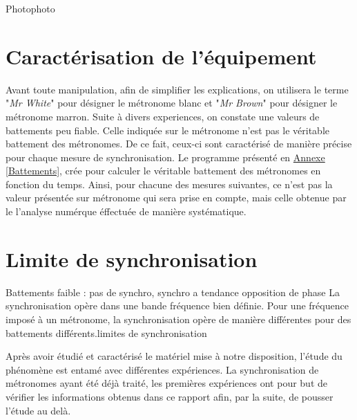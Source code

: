 \documentclass[a4paper,11pt]{report}
\begin{document}
Photophoto

\section{Caractérisation de l'équipement}
Avant toute manipulation, afin de simplifier les explications, on utilisera le terme "{\it Mr White}" pour désigner le métronome blanc et "{\it Mr Brown}" pour désigner le métronome marron.
Suite à divers experiences, on constate une valeurs de battements peu fiable. Celle indiquée sur le métronome n'est pas le véritable battement des métronomes. De ce fait, ceux-ci sont caractérisé de manière précise pour chaque mesure de synchronisation. Le programme présenté en \underline{Annexe \ref{Battements}}, crée pour calculer le véritable battement des métronomes en fonction du temps. Ainsi, pour chacune des mesures suivantes, ce n'est pas la valeur présentée sur métronome qui sera prise en compte, mais celle obtenue par le l'analyse numérque éffectuée de manière systématique.

\section{Limite de synchronisation}
Battements faible : pas de synchro, synchro a tendance opposition de phase
La synchronisation opère dans une bande fréquence bien définie. Pour une fréquence imposé à un métronome, la synchronisation opère de manière différentes pour des battements différents.limites de synchronisation

	Après avoir étudié et caractérisé le matériel mise à notre disposition, l'étude du phénomène est entamé avec différentes expériences. La synchronisation de métronomes ayant été déjà traité, les premières expériences ont pour but de vérifier les informations obtenus dans ce rapport afin, par la suite, de pousser l'étude au delà.
	 
\end{document}

